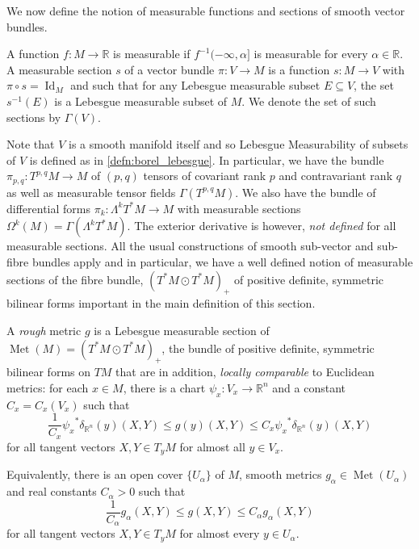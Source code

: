 \documentclass[a4paper, 12pt]{amsart}
\numberwithin{equation}{section}
\renewcommand{\~}{\tilde}
\renewcommand{\-}{\bar}
\newcommand{\R}{\mathbb{R}}
\newcommand{\8}{\infty}
\DeclareMathOperator{\Id}{Id}
\DeclareMathOperator{\met}{Met}
\newcommand{\pullb}[1]{{#1}^\ast}			%
\begin{document}
We now define the notion of measurable functions and sections of smooth vector bundles.

\begin{defn}
A function $f: M \to \R$ is measurable if $f^{-1}(-\infty, \alpha]$ is measurable for every $\alpha  \in \R$. A measurable section \(s\) of a vector bundle \(\pi : V \to M\) is a function \(s: M \to V\) with \(\pi \circ s = \Id_M\) and such that for any Lebesgue measurable subset \(E \subseteq V\), the set \(s^{-1}(E)\) is a Lebesgue measurable subset of \(M\).  We denote the set of such sections by $\Gamma(V)$.
\end{defn}

Note that \(V\) is a smooth manifold itself and so Lebesgue Measurability of subsets of \(V\) is defined as in \ref{defn:borel_lebesgue}. In particular, we have the bundle $\pi_{p,q} : T^{p,q}M \to M$ of $(p,q)$ tensors of covariant rank $p$ and contravariant rank $q$ as well as measurable tensor fields \(\Gamma(T^{p,q}M)\). We also have the bundle of differential forms \(\pi_k : \Lambda^k T^{\ast} M \to M\) with measurable sections \(\Omega^k(M) = \Gamma(\Lambda^k T^{\ast} M)\). The exterior derivative is however, \emph{not defined} for all measurable sections. All the usual constructions of smooth sub-vector and sub-fibre bundles apply and in particular, we have a well defined notion of measurable sections of the fibre bundle, \((T^{\ast} M \odot T^{\ast} M)_+\) of positive definite, symmetric bilinear forms important in the main definition of this section.

\begin{defn}
\label{defn:rough_metric}
A \emph{rough} metric \(g\) is a Lebesgue measurable section of \(\met(M) = (T^{\ast} M \odot T^{\ast} M)_+\), the bundle of positive definite, symmetric bilinear forms on \(TM\) that are in addition, \emph{locally comparable} to Euclidean metrics:
for each $x \in M$, there is a chart $\psi_x:V_x \to \R^n$ and a constant $C_x = C_x(V_x)$ such that
\[
\frac{1}{C_{x}} \pullb{\psi_x}\delta_{\R^n}(y) (X, Y) \leq g(y)(X, Y) \leq C_{x} \pullb{\psi_x}\delta_{\R^n}(y) (X, Y)
\]
for all tangent vectors \(X, Y \in T_yM\) for almost all $y \in V_x$. 
\end{defn}

\begin{rem}
Equivalently, there is an open cover \(\lbrace U_{\alpha} \rbrace\) of \(M\), smooth metrics \(g_{\alpha} \in \met(U_{\alpha})\) and real constants \(C_{\alpha} > 0\) such that
\[
\frac{1}{C_{\alpha}} g_{\alpha} (X, Y) \leq g(X, Y) \leq C_{\alpha} g_{\alpha} (X, Y)
\]
for all tangent vectors \(X, Y \in T_yM\) for almost every $y \in U_\alpha$.
\end{rem}
\end{document}
